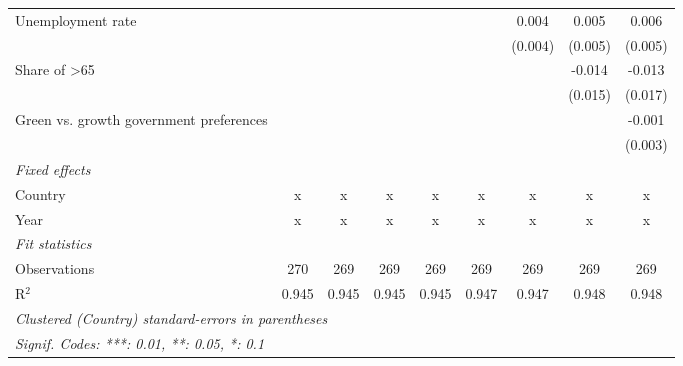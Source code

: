 \begin{table}[htbp]
\begin{tabular}{lcccccccc}
      Unemployment rate                                                 &         &         &         &         &         & 0.004   & 0.005   & 0.006\\   
                                                                        &         &         &         &         &         & (0.004) & (0.005) & (0.005)\\   
      Share of >65                                                      &         &         &         &         &         &         & -0.014  & -0.013\\   
                                                                        &         &         &         &         &         &         & (0.015) & (0.017)\\   
      Green vs. growth government preferences                           &         &         &         &         &         &         &         & -0.001\\   
                                                                        &         &         &         &         &         &         &         & (0.003)\\   
      \emph{Fixed effects}\\
      Country                                                           & x       & x       & x       & x       & x       & x       & x       & x\\  
      Year                                                              & x       & x       & x       & x       & x       & x       & x       & x\\  
      \midrule \emph{Fit statistics}\\
      Observations                                                      & 270     & 269     & 269     & 269     & 269     & 269     & 269     & 269\\  
      R$^2$                                                             & 0.945   & 0.945   & 0.945   & 0.945   & 0.947   & 0.947   & 0.948   & 0.948\\  
      \midrule
      \multicolumn{9}{l}{\emph{Clustered (Country) standard-errors in parentheses}}\\
      \multicolumn{9}{l}{\emph{Signif. Codes: ***: 0.01, **: 0.05, *: 0.1}}\\
   \end{tabular}
\end{table}


